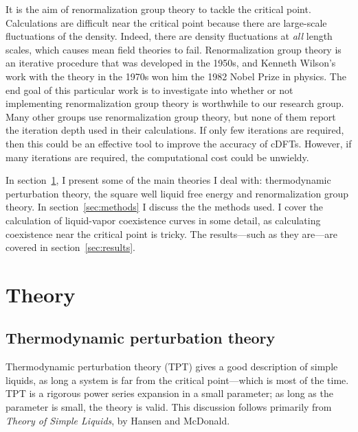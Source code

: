 \documentclass[letterpaper,twocolumn,amsmath,amssymb,prb]{revtex4-1}
\begin{document}
It is the aim of renormalization group theory to tackle the critical
point. Calculations are difficult near the critical point because
there are large-scale fluctuations of the density. Indeed, there are
density fluctuations at \emph{all} length scales, which causes mean
field theories to fail. Renormalization group theory is an iterative
procedure that was developed in the 1950s, and Kenneth Wilson's work
with the theory in the 1970s won him the 1982 Nobel Prize in
physics.\cite{Nobel82} The end goal of this particular work is to
investigate into whether or not implementing renormalization group
theory is worthwhile to our research group. Many other groups use
renormalization group theory, but none of them report the iteration
depth used in their
calculations.\cite{Forte11,Ramana12,Ghobadi13,Wang13,Zhao13} If only
few iterations are required, then this could be an effective tool to
improve the accuracy of cDFTs. However, if many iterations are
required, the computational cost could be unwieldy.

In section~\ref{sec:theory}, I present some of the main theories I
deal with: thermodynamic perturbation
theory, the square well liquid free energy and renormalization group theory. In
section~\ref{sec:methods} I discuss the the methods used. I cover the
calculation of liquid-vapor coexistence curves in some detail, as
calculating coexistence near the critical point is tricky. The
results---such as they are---are covered in section~\ref{sec:results}.
\section{Theory}\label{sec:theory}

\subsection{Thermodynamic perturbation theory}\label{subsec:TPT}

Thermodynamic perturbation theory (TPT) gives a good description of
simple liquids, as long a system is far from the critical point---which
is most of the time. TPT is a rigorous power series
expansion in a small parameter; as long as the parameter is small, the
theory is valid. This discussion follows primarily from \textit{Theory
  of Simple Liquids}, by Hansen and McDonald\cite{Hansen06}.
\end{document}
